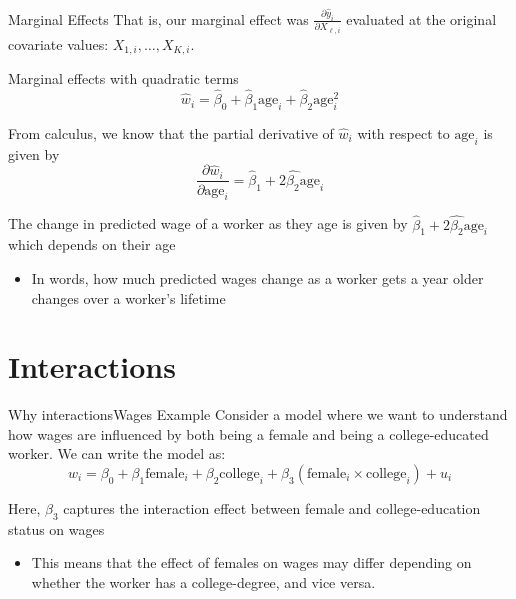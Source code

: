 \documentclass[aspectratio=169,t,11pt,table]{beamer}
\begin{document}
\begin{frame}{Marginal Effects}
  That is, our marginal effect was $\frac{\partial \hat{y}_i}{\partial X_{\ell,i}}$ evaluated at the original covariate values: $X_{1,i}, \dots, X_{K,i}$.
\end{frame}

\begin{frame}{Marginal effects with quadratic terms}
  \vspace{-\bigskipamount}
  $$
    \hat{w}_i = \hat{\beta}_0 + \hat{\beta}_1 \text{age}_i + \hat{\beta}_2 \text{age}_i^2
  $$

  From calculus, we know that the partial derivative of $\hat{w}_i$ with respect to $\text{age}_i$ is given by 
  $$
    \frac{\partial \hat{w}_i}{\partial \text{age}_i} = \hat{\beta}_1 + 2 \hat{\beta_2} \text{age}_i
  $$
  
  \pause
  \bigskip
  The change in predicted wage of a worker as they age is given by $\hat{\beta}_1 + 2 \hat{\beta_2} \text{age}_i$ which depends on their age
  \begin{itemize}
    \item In words, how much predicted wages change as a worker gets a year older changes over a worker's lifetime
  \end{itemize}
\end{frame}





\section{Interactions}


\begin{frame}{Why interactions}{Wages Example}
  Consider a model where we want to understand how wages are influenced by both being a female and being a college-educated worker. We can write the model as:
  $$
    w_i = \beta_0 + \beta_1 \text{female}_i + \beta_2 \text{college}_i + \beta_3 (\text{female}_i \times \text{college}_i) + u_i
  $$
  
  \bigskip
  Here, $\beta_3$ captures the interaction effect between female and college-education status on wages
  \begin{itemize}
    \item This means that the effect of females on wages may differ depending on whether the worker has a college-degree, and vice versa.
  \end{itemize}
\end{frame}
\end{document}
